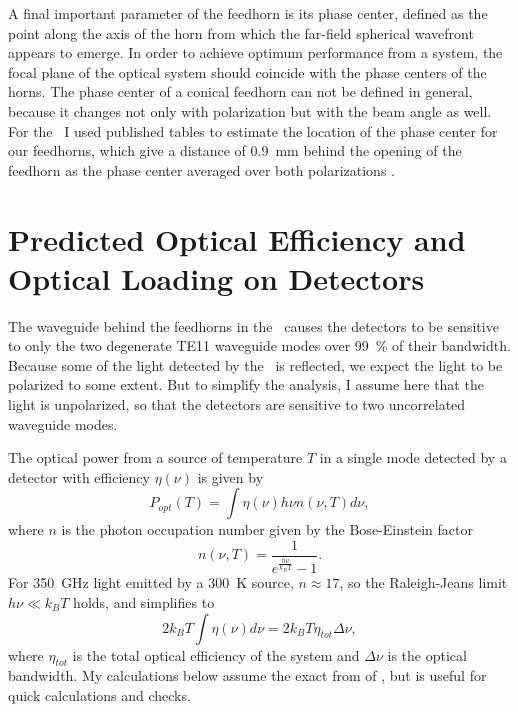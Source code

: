 A final important parameter of the feedhorn is its phase center, defined as the point along the axis of the horn from which the far-field spherical wavefront appears to emerge.
In order to achieve optimum performance from a system, the focal plane of the optical system should coincide with the phase centers of the horns.
The phase center of a conical feedhorn can not be defined in general, because it changes not only with polarization but with the beam angle as well.
For the \Imager\ I used published tables to estimate the location of the phase center for our feedhorns, which give a distance of \SI{0.9}{\mm} behind the opening of the feedhorn as the phase center averaged over both polarizations \cite[Page~353]{thomas_a._milligan_modern_2005}.

\section{Predicted Optical Efficiency and Optical Loading on Detectors} \label{sec:ch4-opt-eff}

The waveguide behind the feedhorns in the \Imager\ causes the detectors to be sensitive to only the two degenerate TE11 waveguide modes over \SI{99}{\percent} of their bandwidth.
Because some of the light detected by the \Imager\ is reflected, we expect the light to be polarized to some extent.
But to simplify the analysis, I assume here that the light is unpolarized, so that the detectors are sensitive to two uncorrelated waveguide modes.

The optical power from a source of temperature $T$ in a single mode detected by a detector with efficiency $\eta(\nu)$ is given by \cite{zmuidzinas_thermal_2003}
\begin{equation} \label{eqn:ch4-power-per-mode}
  P_{opt}(T) = \int \eta(\nu) h \nu n(\nu,T) d \nu ,
\end{equation}
where $n$ is the photon occupation number given by the Bose-Einstein factor
\begin{equation} \label{eqn:ch4-photon-n}
  n(\nu,T) = \frac{1}{e^{\frac{h \nu}{k_B T}} -1}.
\end{equation}
For \SI{350}{\GHz} light emitted by a \SI{300}{\K} source, $n \approx 17$, so the Raleigh-Jeans limit $h \nu \ll k_B T$ holds, and  simplifies to
\begin{equation} \label{eqn:ch4-power-per-mode-rj}
  2 k_B T \int \eta(\nu) d \nu = 2 k_B T \eta_{tot} \Delta \nu,
\end{equation}
where $\eta_{tot}$ is the total optical efficiency of the system and $\Delta \nu$ is the optical bandwidth.
My calculations below assume the exact from of , but  is useful for quick calculations and checks.

